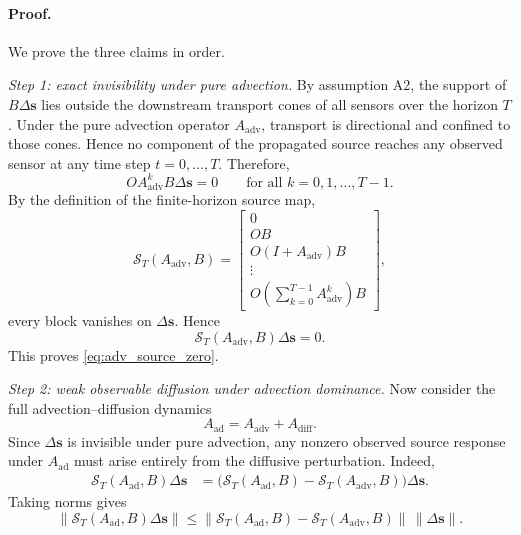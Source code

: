 \paragraph{Proof.}
We prove the three claims in order.

\emph{Step 1: exact invisibility under pure advection.}
By assumption A2, the support of $B\Delta \mathbf{s}$ lies outside the downstream transport cones of all sensors over the horizon $T$. Under the pure advection operator $A_{\mathrm{adv}}$, transport is directional and confined to those cones. Hence no component of the propagated source reaches any observed sensor at any time step $t=0,\dots,T$. Therefore,
\begin{equation}
O A_{\mathrm{adv}}^k B \Delta \mathbf{s} = 0
\qquad
\text{for all } k=0,1,\dots,T-1. \nonumber
\label{eq:adv_source_each_step_zero}
\end{equation}
By the definition of the finite-horizon source map,
\begin{equation}
\mathcal{S}_T(A_{\mathrm{adv}},B)
=
\begin{bmatrix}
0\\
OB\\
O(I+A_{\mathrm{adv}})B\\
\vdots\\
O\left(\sum_{k=0}^{T-1}A_{\mathrm{adv}}^k\right)B
\end{bmatrix}, \nonumber
\end{equation}
every block vanishes on $\Delta \mathbf{s}$. Hence
\begin{equation}
\mathcal{S}_T(A_{\mathrm{adv}},B)\Delta \mathbf{s}=0. \nonumber
\end{equation}
This proves \eqref{eq:adv_source_zero}.

\emph{Step 2: weak observable diffusion under advection dominance.}
Now consider the full advection--diffusion dynamics
\begin{equation}
A_{\mathrm{ad}} = A_{\mathrm{adv}} + A_{\mathrm{diff}}. \nonumber
\end{equation}
Since $\Delta \mathbf{s}$ is invisible under pure advection, any nonzero observed source response under $A_{\mathrm{ad}}$ must arise entirely from the diffusive perturbation. Indeed,
\begin{align}
\mathcal{S}_T(A_{\mathrm{ad}},B)\Delta \mathbf{s}
&=
\big(\mathcal{S}_T(A_{\mathrm{ad}},B)-\mathcal{S}_T(A_{\mathrm{adv}},B)\big)\Delta \mathbf{s}. \nonumber
\label{eq:source_map_difference_identity}
\end{align}
Taking norms gives
\begin{equation}
\|\mathcal{S}_T(A_{\mathrm{ad}},B)\Delta \mathbf{s}\|
\le
\|\mathcal{S}_T(A_{\mathrm{ad}},B)-\mathcal{S}_T(A_{\mathrm{adv}},B)\|\,\|\Delta \mathbf{s}\|. \nonumber
\label{eq:source_map_norm_bound}
\end{equation}

